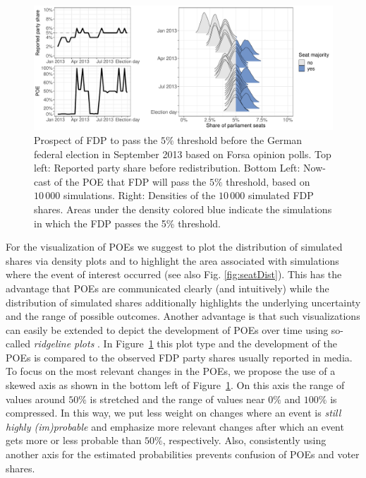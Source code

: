 \documentclass[smallextended]{svjour3}      %
\begin{document}
\begin{figure}[H]\centering
\includegraphics[width=1\textwidth]{figures/fdp_2013_threshold.pdf}
\caption{Prospect of FDP to pass the $5\%$ threshold before the
German federal election in September 2013 based on Forsa opinion polls.
Top left: Reported party share before redistribution. Bottom Left: Now-cast
of the POE that FDP will pass the $5\%$ threshold, based on $10\,000$ simulations.
Right: Densities of the $10\,000$ simulated FDP shares. Areas under
the density colored blue indicate the simulations in which the FDP passes the
5\% threshold.
\label{fig:2013_fdp}
}
\end{figure}

For the visualization of POEs we suggest to plot the distribution of
simulated shares via density plots and to highlight the area associated
with simulations where the event of interest occurred
(see also Fig. \ref{fig:seatDist}). This has the advantage that POEs are
communicated clearly (and intuitively) while the distribution of simulated
shares additionally highlights the underlying uncertainty and the range
of possible outcomes. Another advantage is that such visualizations can easily
be extended to depict the development of POEs over time using so-called
\emph{ridgeline plots} \citep{wilke_2017}. In Figure~\ref{fig:2013_fdp} this
plot type and the development of the POEs is compared to the observed
FDP party shares usually reported in media. \\

To focus on the most relevant changes in the POEs, we propose
the use of a skewed axis as shown in the bottom left of Figure~\ref{fig:2013_fdp}.
On this axis
the range of values around $50\%$ is stretched and the range of values near
$0\%$ and $100\%$ is compressed. In this way, we put less weight on changes
where an event is {\it still highly (im)probable} and emphasize more relevant
changes after which an event gets more or less probable than $50\%$, respectively. Also,
consistently using another axis for the estimated probabilities prevents
confusion of POEs and voter shares.
\end{document}
